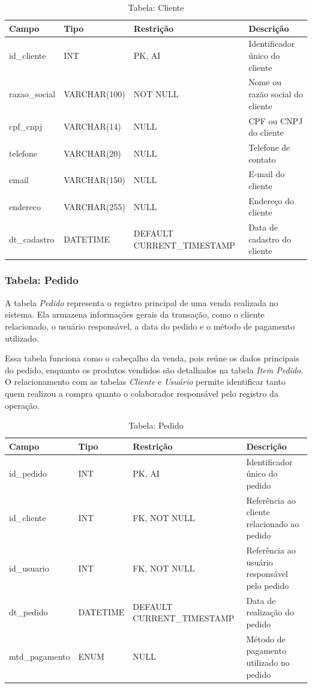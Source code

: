 \begin{table}[H]
\centering
\begin{tabular}{|p{3cm}|p{3cm}|p{3cm}|p{5cm}|}
\hline
\textbf{Campo} & \textbf{Tipo} & \textbf{Restrição} & \textbf{Descrição} \\ \hline
id\_cliente & INT & PK, AI & Identificador único do cliente \\ \hline
razao\_social & VARCHAR(100) & NOT NULL & Nome ou razão social do cliente \\ \hline
cpf\_cnpj & VARCHAR(14) & NULL & CPF ou CNPJ do cliente \\ \hline
telefone & VARCHAR(20) & NULL & Telefone de contato \\ \hline
email & VARCHAR(150) & NULL & E-mail do cliente \\ \hline
endereco & VARCHAR(255) & NULL & Endereço do cliente \\ \hline
dt\_cadastro & DATETIME & DEFAULT CURRENT\_TIMESTAMP & Data de cadastro do cliente \\ \hline
\end{tabular}
\caption{Tabela: Cliente}
\end{table}

\subsubsection{Tabela: Pedido}

A tabela \textit{Pedido} representa o registro principal de uma venda realizada no sistema. Ela armazena informações gerais da transação, como o cliente relacionado, o usuário responsável, a data do pedido e o método de pagamento utilizado.

Essa tabela funciona como o cabeçalho da venda, pois reúne os dados principais do pedido, enquanto os produtos vendidos são detalhados na tabela \textit{Item Pedido}. O relacionamento com as tabelas \textit{Cliente} e \textit{Usuário} permite identificar tanto quem realizou a compra quanto o colaborador responsável pelo registro da operação.

\begin{table}[H]
\centering
\begin{tabular}{|p{3cm}|p{3cm}|p{3cm}|p{5cm}|}
\hline
\textbf{Campo} & \textbf{Tipo} & \textbf{Restrição} & \textbf{Descrição} \\ \hline
id\_pedido & INT & PK, AI & Identificador único do pedido \\ \hline
id\_cliente & INT & FK, NOT NULL & Referência ao cliente relacionado ao pedido \\ \hline
id\_usuario & INT & FK, NOT NULL & Referência ao usuário responsável pelo pedido \\ \hline
dt\_pedido & DATETIME & DEFAULT CURRENT\_TIMESTAMP & Data de realização do pedido \\ \hline
mtd\_pagamento & ENUM & NULL & Método de pagamento utilizado no pedido \\ \hline
\end{tabular}
\caption{Tabela: Pedido}
\end{table}

